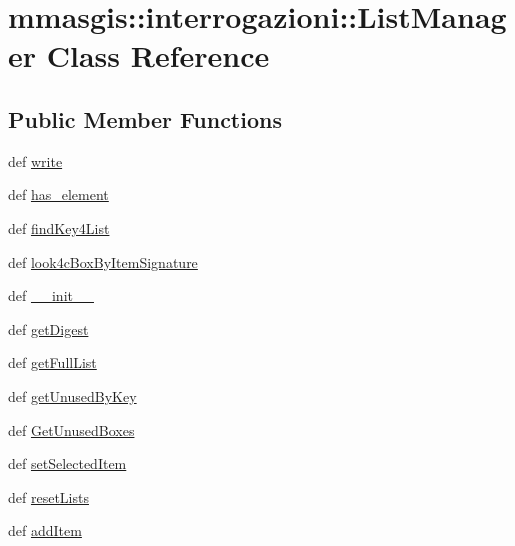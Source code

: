 \hypertarget{classmmasgis_1_1interrogazioni_1_1ListManager}{
\section{mmasgis::interrogazioni::ListManager Class Reference}
\label{classmmasgis_1_1interrogazioni_1_1ListManager}
}
\subsection*{Public Member Functions}
\begin{DoxyCompactItemize}
\item 
def \hyperlink{classmmasgis_1_1interrogazioni_1_1ListManager_a2a565efd21b2ddc21a6e91a7cda545d3}{write}
\item 
def \hyperlink{classmmasgis_1_1interrogazioni_1_1ListManager_a64b074bf06dba5d05591cf4eecd85f95}{has\_\-element}
\item 
def \hyperlink{classmmasgis_1_1interrogazioni_1_1ListManager_ab24e5031e529dd10c2587bc5da9ce943}{findKey4List}
\item 
def \hyperlink{classmmasgis_1_1interrogazioni_1_1ListManager_a2cabb08f57d81766b37ba829496d378c}{look4cBoxByItemSignature}
\item 
def \hyperlink{classmmasgis_1_1interrogazioni_1_1ListManager_a7452b8cad8172913ac4586efa573388e}{\_\-\_\-init\_\-\_\-}
\item 
def \hyperlink{classmmasgis_1_1interrogazioni_1_1ListManager_a7c822cad107b80c207b056a115875956}{getDigest}
\item 
def \hyperlink{classmmasgis_1_1interrogazioni_1_1ListManager_a186f095bbb198e58f8b1376688cb08bc}{getFullList}
\item 
def \hyperlink{classmmasgis_1_1interrogazioni_1_1ListManager_a34d6f069adb3329e7552b4ddcb51897a}{getUnusedByKey}
\item 
def \hyperlink{classmmasgis_1_1interrogazioni_1_1ListManager_a5e0b0fa27726a5cf12ad3e6f20c0e3f9}{GetUnusedBoxes}
\item 
def \hyperlink{classmmasgis_1_1interrogazioni_1_1ListManager_a00b4446b897cab7cdc226eb5fe9431b8}{setSelectedItem}
\item 
def \hyperlink{classmmasgis_1_1interrogazioni_1_1ListManager_ac2ddc9cbfd9d6e3cefd79278868d3dbc}{resetLists}
\item 
def \hyperlink{classmmasgis_1_1interrogazioni_1_1ListManager_a44eeaf06c804549767ac4ad40f4c8a2c}{addItem}
\item 

\end{DoxyCompactItemize}
